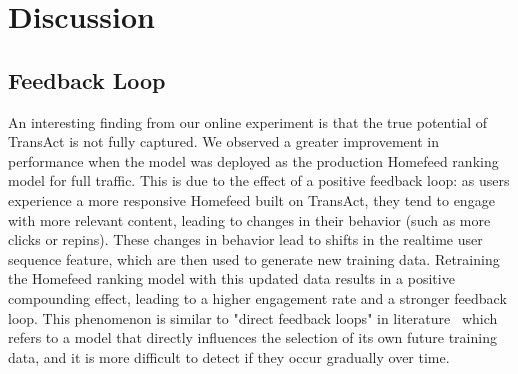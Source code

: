 \section{Discussion}
\label{sec:discussion}
\subsection{Feedback Loop}


An interesting finding from our online experiment is that the true potential of TransAct is not fully captured. We observed a greater improvement in performance when the model was deployed as the production Homefeed ranking model for full traffic. This is due to the effect of a positive feedback loop: as users experience a more responsive Homefeed built on TransAct, they tend to engage with more relevant content, leading to changes in their behavior (such as more clicks or repins). These changes in behavior lead to shifts in the realtime user sequence feature, which are then used to generate new training data. Retraining the Homefeed ranking model with this updated data results in a positive compounding effect, leading to a higher engagement rate and a stronger feedback loop. This phenomenon is similar to "direct feedback loops" in literature~\cite{tech_debt} which refers to a model that directly influences the selection of its own future training data, and it is more difficult to detect if they occur gradually over time.


